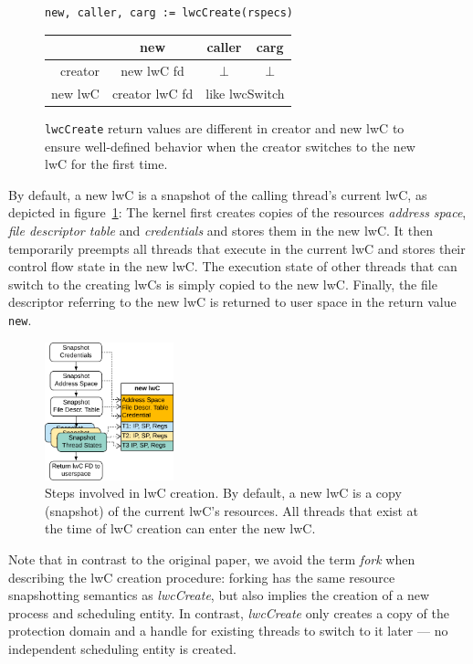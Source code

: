 \documentclass[10pt,twocolumn,letter]{article}
\begin{document}
\begin{figure}[h]
  \centering
\begin{lstlisting}[mathescape]
  new, caller, carg := lwcCreate(rspecs)
\end{lstlisting}
\begin{tabular}{|r||c|c|c|}
  \hline
                &   new        & caller       & carg \\
  \hline\hline
  creator       & new lwC fd   & $\bot$      & $\bot$\\
  \hline
  new lwC       &    creator lwC fd   & \multicolumn{2}{c|}{like lwcSwitch}\\
  \hline
\end{tabular}
\caption{
  \texttt{lwcCreate} return values are different in creator and new lwC to ensure well-defined behavior when the creator switches to the new lwC for the first time.
}
\end{figure}

By default, a new lwC is a snapshot of the calling thread's current lwC, as depicted in figure~\ref{design:fig:lwccreationsequencediagram}:
The kernel first creates copies of the resources \textit{address space}, \textit{file descriptor table} and \textit{credentials} and stores them in the new lwC.
It then temporarily preempts all threads that execute in the current lwC and stores their control flow state in the new lwC.
The execution state of other threads that can switch to the creating lwCs is simply copied to the new lwC.
Finally, the file descriptor referring to the new lwC is returned to user space in the return value \lstinline{new}.

\begin{figure}
  \centering
  \includegraphics[height=4cm]{fig/lwc-creation-sequence-diagram}
  \caption{
    Steps involved in lwC creation.
    By default, a new lwC is a copy (snapshot) of the current lwC's resources.
    All threads that exist at the time of lwC creation can enter the new lwC.
  }
\label{design:fig:lwccreationsequencediagram}
\end{figure}

Note that in contrast to the original paper, we avoid the term \textit{fork} when describing the lwC creation procedure:
forking has the same resource snapshotting semantics as \textit{lwcCreate}, but also implies the creation of a new process and scheduling entity.
In contrast, \textit{lwcCreate} only creates a copy of the protection domain and a handle for existing threads to switch to it later --- no independent scheduling entity is created.
\end{document}
